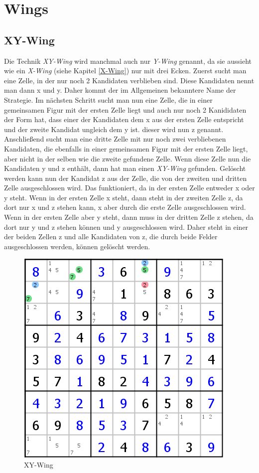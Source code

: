 \documentclass[accentcolor=tud6b,11pt,paper=a4]{tudreport}
\begin{document}
\section{Wings}
\subsection{XY-Wing}
Die Technik \textit{XY-Wing} wird manchmal auch nur \textit{Y-Wing} genannt, da sie aussieht wie ein \textit{X-Wing} (siehe Kapitel \ref{X-Wing}) nur mit drei Ecken. Zuerst sucht man eine Zelle, in der nur noch 2 Kandidaten verblieben sind. Diese Kandidaten nennt man dann x und y. Daher kommt der im Allgemeinen bekanntere Name der Strategie. Im nächsten Schritt sucht man nun eine Zelle, die in einer gemeinsamen Figur mit der ersten Zelle liegt und auch nur noch 2 Kanididaten der Form hat, dass einer der Kandidaten dem x aus der ersten Zelle entspricht und der zweite Kandidat ungleich dem y ist. dieser wird nun z genannt. Anschließend sucht man eine dritte Zelle mit nur noch zwei verbliebenen Kandidaten, die ebenfalls in einer gemeinsamen Figur mit der ersten Zelle liegt, aber nicht in der selben wie die zweite gefundene Zelle. Wenn diese Zelle nun die Kandidaten y und z enthält, dann hat man einen \textit{XY-Wing} gefunden. Gelöscht werden kann nun der Kandidat z aus der Zelle, die von der zweiten und dritten Zelle ausgeschlossen wird. Das funktioniert, da in der ersten Zelle entweder x oder y steht. Wenn in der ersten Zelle x steht, dann steht in der zweiten Zelle z, da dort nur x und z stehen kann, x aber durch die erste Zelle ausgeschlossen wird. Wenn in der ersten Zelle aber y steht, dann muss in der dritten Zelle z stehen, da dort nur y und z stehen können und y ausgeschlossen wird. Daher steht in einer der beiden Zellen z und alle Kandidaten von z, die durch beide Felder ausgeschlossen werden, können gelöscht werden.

\begin{figure}[h]
\begin{center}
\includegraphics{./img/XY_Wing.png}
\caption{XY-Wing}
\end{center}
\end{figure}
\end{document}
